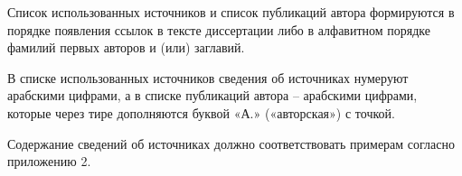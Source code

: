 

Список использованных источников и список публикаций автора формируются в порядке появления ссылок в тексте диссертации либо в алфавитном порядке фамилий первых авторов и (или) заглавий.

В списке использованных источников сведения об источниках нумеруют арабскими цифрами, а в списке публикаций автора – арабскими цифрами, которые через тире дополняются буквой «А.» («авторская») с точкой.

Содержание сведений об источниках должно соответствовать примерам согласно приложению 2.